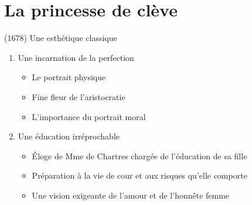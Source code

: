 \documentclass[12pt,a4paper]{article}
\begin{document}
\section*{La princesse de clève}
	(1678) Une esthétique classique
\begin{enumerate}
   \item Une incarnation de la perfection
   \begin{itemize}
     \item Le portrait physique
     \item Fine fleur de l'aristocratie
     \item L'importance du portrait moral
   \end{itemize}
   \item Une éducation irréprochable
   \begin{itemize}
       \item Éloge de Mme de Chartres chargée de l'éducation de sa fille
       \item Préparation à la vie de cour et aux risques qu'elle comporte
       \item Une vision exigeante de l'amour et de l'honnête femme
    \end{itemize}
\end{enumerate}
\end{document}
